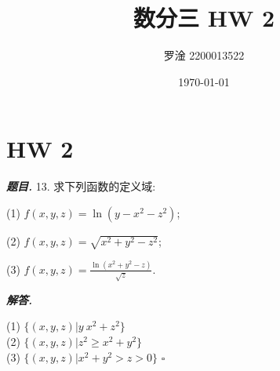 \documentclass[10pt, a4paper, oneside]{ctexart}
\title{\textbf{数分三 HW 2}}
\author{罗淦 2200013522}
\date{\today}
\newenvironment{problem}{\begin{framed}\par\noindent\textbf{\textit{题目. }}}{\end{framed}\par}
\newenvironment{solution}{%
  \par\noindent\textbf{\textit{解答. }}\ignorespaces
}{%
  \hfill\ensuremath{\square}\par %
}
\begin{document}
\maketitle


\section{HW 2}


\begin{problem}
13. 求下列函数的定义域:

(1) $f(x, y, z)=\ln \left(y-x^2-z^2\right)$;

(2) $f(x, y, z)=\sqrt{x^2+y^2-z^2}$;

(3) $f(x, y, z)=\frac{\ln \left(x^2+y^2-z\right)}{\sqrt{z}}$.
\end{problem}
\begin{solution}
(1) $\{(x,y,z)| y\> x^2+z^2\}$\\
(2) $\{(x,y,z)| z^2\geq x^2+y^2\}$\\
(3) $\{(x,y,z)| x^2+y^2>z>0\}$
\end{solution}
\end{document}
